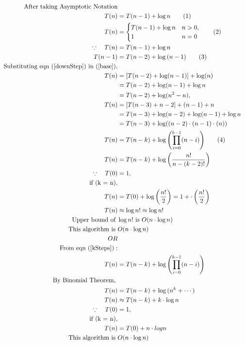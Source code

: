 \documentclass[]{article}
\theoremstyle{plain}
\theoremstyle{definition}
\begin{document}
\begin{align*}
    \text{After taking Asymptotic Notation}\\
    T(n) &= T(n - 1) + \log{n} \tag{1} \label{base}\\
    T(n) &=
    \begin{cases}
        T(n - 1) + \log{n} & n > 0, \\
        1 & n = 0
    \end{cases} \tag{2} \\  
    \because \hspace{10pt} T(n) &= T(n - 1) + \log{n}  \\
    T(n - 1) &= T(n - 2) + \log{(n - 1)} \tag{3} \label{downStep}\\
    \text{Substituting eqn } (\ref{downStep}) \text{ in } (\ref{base}),  \\
    T(n)&= [T(n - 2) + \log(n - 1)] + \log(n)\\ 
        &= T(n - 2) + \log(n-1) + \log{n}\\ &= T(n-2) + \log (n^2-n), \\
    T(n)&= [T(n - 3) + n - 2] + (n-1) + n \\
        &= T(n - 3) + \log(n-2) + \log(n-1) + \log n\\
        &= T(n-3) + \log ((n-2) \cdot (n-1) \cdot(n)) \\
    T(n) &= T(n-k) + \log{\left(\prod_{i=0}^{k-1} (n-i) \right)} \label{kSteps} \tag{4}\\
    T(n) &= T(n-k) + \log \left(\frac{n!}{n-(k-2)!}\right)\\
    \because \hspace{10pt} T(0) &= 1, \\
    \text{if (k = n)}, \\
    T(n) &= T(0) + \log \left( \frac{n!}{2}\right) = 1 + \cdot \left( \frac{n!}{2}\right) \\
    T(n) &\approx \log{n!}  \approx \log{n!}\\
    \text{Upper bound of }& \log{n!}  \text{ is }O(n \cdot \log{n})\\
    \text{This algorithm is } & O(n \cdot \log{n})\\
    OR & \\
    \text{From eqn (\ref{kSteps})}:\\
    T(n) &= T(n-k) + \log{\left(\prod_{i=0}^{k-1} (n-i) \right)}\\
    \text{By Binomial Theorem, }\\
    T(n) &= T(n-k) + \log{(n^k + \cdots) }\\
    T(n) &\approx T(n-k) + k \cdot \log {n}\\
    \because \hspace{10pt} T(0) &= 1, \\
    \text{if (k = n)}, \\
    T(n) &= T(0) + n \cdot log{n}\\
    \text{This algorithm is } & O(n \cdot \log{n})
\end{align*}
\end{document}
